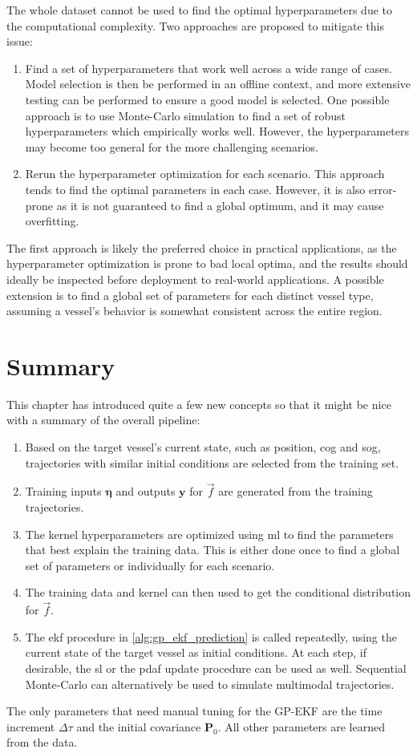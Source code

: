 The whole dataset cannot be used to find the optimal hyperparameters due to the computational complexity. Two approaches are proposed to mitigate this issue:
\begin{enumerate}
    \item Find a set of hyperparameters that work well across a wide range of cases. Model selection is then be performed in an offline context, and more extensive testing can be performed to ensure a good model is selected. One possible approach is to use Monte-Carlo simulation to find a set of robust hyperparameters which empirically works well. However, the hyperparameters may become too general for the more challenging scenarios.
    \item Rerun the hyperparameter optimization for each scenario. This approach tends to find the optimal parameters in each case. However, it is also error-prone as it is not guaranteed to find a global optimum, and it may cause overfitting.
\end{enumerate}

The first approach is likely the preferred choice in practical applications, as the hyperparameter optimization is prone to bad local optima, and the results should ideally be inspected before deployment to real-world applications. A possible extension is to find a global set of parameters for each distinct vessel type, assuming a vessel's behavior is somewhat consistent across the entire region.

\section{Summary}
This chapter has introduced quite a few new concepts so that it might be nice with a summary of the overall pipeline:

\begin{enumerate}
    \item Based on the target vessel's current state, such as position, \acrshort{cog} and \acrshort{sog}, trajectories with similar initial conditions are selected from the training set.
    \item Training inputs $\boldsymbol{\eta}$ and outputs $\boldsymbol{y}$ for $\vec{f}$ are generated from the training trajectories.
    \item The kernel hyperparameters are optimized using \acrshort{ml} to find the parameters that best explain the training data. This is either done once to find a global set of parameters or individually for each scenario.
    \item The training data and kernel can then used to get the conditional distribution for $\vec{f}$.
    \item The \acrshort{ekf} procedure in \cref{alg:gp_ekf_prediction} is called repeatedly, using the current state of the target vessel as initial conditions. At each step, if desirable, the \acrshort{sl} or the \acrshort{pdaf} update procedure can be used as well. Sequential Monte-Carlo can alternatively be used to simulate multimodal trajectories.
\end{enumerate}

The only parameters that need manual tuning for the GP-EKF are the time increment $\Delta \tau$ and the initial covariance $\boldsymbol{P}_0$. All other parameters are learned from the data.
